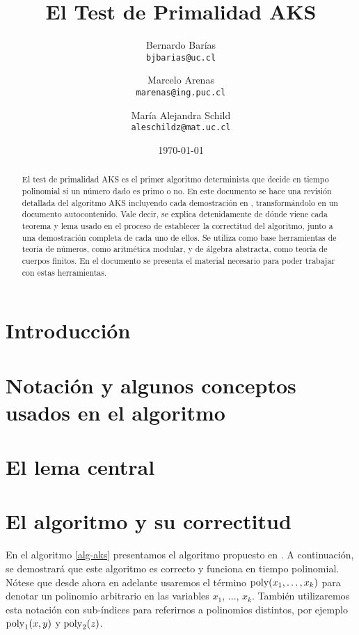 \documentclass[10pt]{article}
\title{{\bf El Test de Primalidad AKS}}
\author{Bernardo Barías \\ 
\texttt{bjbarias@uc.cl}
\and 
Marcelo Arenas\\
\texttt{marenas@ing.puc.cl}
\and
María Alejandra Schild\\
\texttt{aleschildz@mat.uc.cl}}
\date{\today}
\newcommand{\0}{\mathbf{0}}
\newcommand{\1}{\mathbf{1}}
\newcommand{\poly}{{\rm poly}}
\newcommand{\+}{\oplus}
\theoremstyle{remark}
\theoremstyle{remark}
\newcommand{\PRIMO}{\text{\rm PRIMO}}
\newcommand{\COMPUESTO}{\text{\rm COMPUESTO}}
\begin{document}
	
	\maketitle
	
	
	\begin{abstract}
El test de primalidad AKS \cite{AKS04} es el primer algoritmo
determinista que decide en tiempo polinomial si un número dado es
primo o no.
En este documento se hace una revisión detallada del algoritmo AKS
incluyendo cada demostración en \cite{AKS04}, transformándolo en un
documento autocontenido. Vale decir, se explica detenidamente de dónde
viene cada teorema y lema usado en el proceso de establecer la
correctitud del algoritmo, junto a una demostración completa de cada
uno de ellos. Se utiliza como base herramientas de teoría de números,
como aritmética modular, y de álgebra abstracta, como teoría de
cuerpos finitos. En el documento se presenta el material necesario
para poder trabajar con estas herramientas.
\end{abstract}


\section{Introducción}


\section{Notación y algunos conceptos usados en el algoritmo}
\label{sec-notacion}


    
\section{El lema central}
\label{aec-lema-central}

	
\section{El algoritmo y su correctitud}

En el algoritmo \ref{alg-aks} presentamos el algoritmo propuesto en \cite{AKS04}. 
A continuación, se demostrará que este algoritmo es correcto y funciona en tiempo polinomial. Nótese que desde ahora en adelante usaremos el término $\poly(x_1, \ldots, x_k)$ para denotar un  polinomio arbitrario en las variables $x_1$, $\ldots$, $x_k$. También utilizaremos esta notación con sub-índices para referirnos a polinomios distintos, por ejemplo $\poly_1(x,y)$ y $\poly_2(z)$. 
\end{document}

